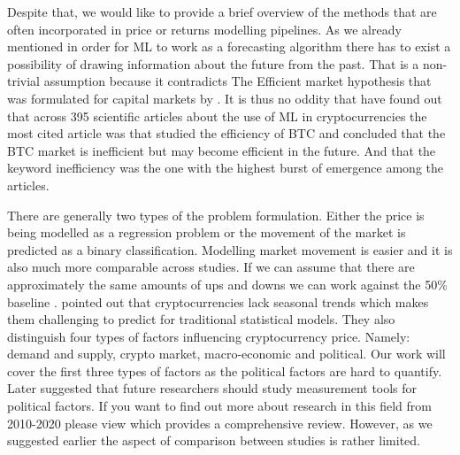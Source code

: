 Despite that, we would like to provide a brief overview
of the methods that are often incorporated in price or returns modelling pipelines.
As we already mentioned in order for \ac{ML} to work as a forecasting
algorithm there has to
exist a possibility of drawing information about the future from the past.
That is a non-trivial assumption because it contradicts The Efficient market 
hypothesis
that was formulated for capital markets by \cite{Fama1970}.
It is thus no oddity that \cite{Ren2022} have found out that across 395 scientific
articles about the use of \ac{ML} in cryptocurrencies the most cited 
article was \citet{Urquhart2016} that studied the efficiency of \ac{BTC} and 
concluded that the \ac{BTC} market is inefficient but may become efficient in the future.
And that the keyword
inefficiency was the one with the highest burst of emergence among the articles.


There are generally two types of the problem formulation. Either the price is 
being modelled as a regression problem or the movement of the market is predicted
as a binary classification. Modelling market movement
is easier and it is also much more comparable across studies. If we can assume 
that there are approximately the same amounts of ups and downs we can work
against the 50\% baseline \citep{Akyildirim2020}.
\cite{Khedr2021} pointed out that cryptocurrencies lack seasonal trends
which makes them challenging to predict for traditional statistical models. 
They also distinguish four types of factors influencing cryptocurrency price.
Namely: demand and supply, crypto market, macro-economic and political. 
Our work will cover the first three types of factors as the political factors
are hard to quantify. Later \cite{Ren2022} suggested that future researchers should
study measurement tools for political factors. 
If you want to find out more about research in this
field from 2010-2020 please view \citep{Khedr2021} which provides a comprehensive
review. However, as we suggested 
earlier the aspect of comparison between studies is rather limited.


